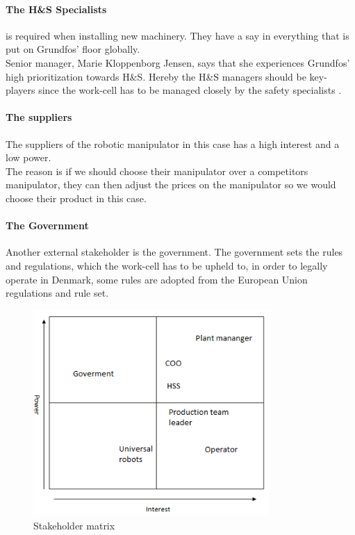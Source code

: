 \paragraph{The H\&S Specialists}\label{ch:SafetyPersonel} 
 is required when installing new machinery. They have a say in everything that is put on Grundfos' floor globally.\\ 
Senior manager, Marie Kloppenborg Jensen, says that she experiences Grundfos' high prioritization towards H\&S. Hereby the H\&S managers should be key-players since the work-cell has to be managed closely by the safety specialists \cite{H&S}.

\paragraph{The suppliers}\label{ch:Universalrobots-stake}
The suppliers of the robotic manipulator in this case has a high interest and a low power.\\The reason is if we should choose their manipulator over a competitors manipulator, they can then adjust the prices on the manipulator so we would choose their product in this case.

\paragraph{The Government}\label{ch:Goverment-requriement}
Another external stakeholder is the government. The government sets the rules and regulations, which the work-cell has to be upheld to, in order to legally operate in Denmark, some rules are adopted from the European Union regulations and rule set.\\

\begin{figure}[h]
    \centering
     \includegraphics[width=9cm]{StakeholderAnalysis/matrix.PNG}
    \caption{Stakeholder matrix}
    \label{fig:Stackholder matrix}
\end{figure}

